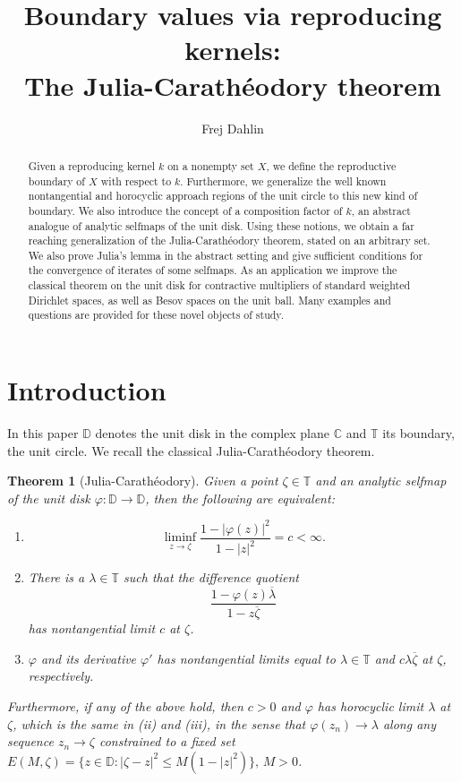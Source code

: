 \documentclass[leqno, final]{article}
\title{Boundary values via reproducing kernels: \\
	The Julia-Carathéodory theorem}
\author{Frej Dahlin}
\newtheorem*{theorem*}{Theorem} %
\theoremstyle{definition}
\newcommand{\disk}{\mathbb{D}}
\newcommand{\plane}{\mathbb{C}}
\newcommand{\torus}{\mathbb{T}}
\renewcommand{\phi}{\varphi}
\begin{document}
\maketitle
\begin{abstract}
Given a reproducing kernel $k$ on a nonempty set $X$, we define the reproductive
boundary of $X$ with respect to $k$. Furthermore, we generalize the well known
nontangential and horocyclic approach regions of the unit circle to this new
kind of boundary. We also introduce the concept of a composition factor of
$k$, an abstract analogue of analytic selfmaps of the unit disk. Using these
notions, we obtain a far reaching generalization of the Julia-Carathéodory
theorem, stated on an arbitrary set. We also prove Julia's lemma in the abstract
setting and give sufficient conditions for the convergence of iterates of some
selfmaps. As an application we improve the classical theorem on the unit disk
for contractive multipliers of standard weighted Dirichlet spaces, as well as
Besov spaces on the unit ball. Many examples and questions are provided for
these novel objects of study.
\end{abstract}

\tableofcontents

\section{Introduction}
In this paper $\disk$ denotes the unit disk in the complex plane $\plane$ and
$\torus$ its boundary, the unit circle. We recall the classical Julia-Carathéodory
theorem.
\begin{theorem*}[Julia-Carathéodory]

Given a point
$\zeta\in\torus$ and an analytic selfmap of the unit disk $\phi:\disk\to\disk$,
then the following are equivalent:
\begin{enumerate}[label=(\roman*)]
\item \[
	\liminf_{z\to\zeta}\frac{1-|\phi(z)|^2}{1-|z|^2} = c < \infty.
\]
\item There is a $\lambda\in\torus$ such that the difference quotient \[
	\frac{1-\phi(z)\overline\lambda}{1-z\overline\zeta}
\]
has nontangential limit $c$ at $\zeta$.
\item $\phi$ and its derivative $\phi'$ has nontangential limits equal to
$\lambda\in\torus$ and $c\lambda\overline\zeta$ at $\zeta$, respectively.
\end{enumerate}
Furthermore, if any of the above hold, then $c>0$ and $\phi$ has horocyclic limit $\lambda$ at $\zeta$, which is the same in (ii)
and (iii), in the sense that $\phi(z_n)\to\lambda$ along any sequence $z_n\to\zeta$
constrained to a fixed set $E(M,\zeta) = \{z\in\disk:|\zeta-z|^2\leq M(1-|z|^2)\},\,M>0$.
\end{theorem*}
\end{document}
